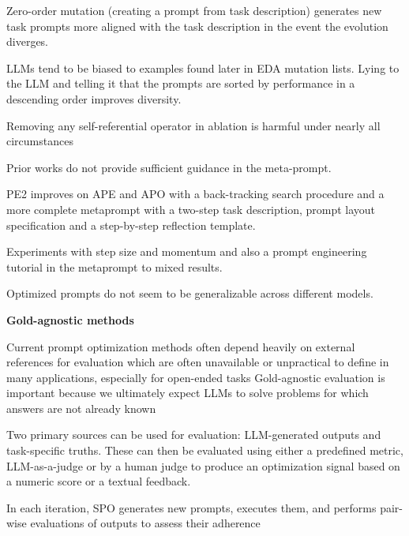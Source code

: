 Zero-order mutation (creating a prompt from task description) generates new task prompts more aligned with the task description in the event the evolution diverges.  \cite{fernando2023promptbreederselfreferentialselfimprovementprompt}

LLMs tend to be biased to examples found later in EDA mutation lists. Lying to the LLM and telling it that the prompts are sorted by performance in a descending order improves diversity.  \cite{fernando2023promptbreederselfreferentialselfimprovementprompt}

Removing any self-referential operator in ablation is harmful under nearly all circumstances \cite{fernando2023promptbreederselfreferentialselfimprovementprompt}


Prior works do not provide sufficient guidance in the meta-prompt. \cite{ye2024promptengineeringpromptengineer}

PE2 improves on APE and APO with a back-tracking search procedure and a more complete metaprompt with a two-step task description, prompt layout specification and a step-by-step reflection template. \cite{ye2024promptengineeringpromptengineer}

Experiments with step size and momentum and also a prompt engineering tutorial in the metaprompt to mixed results. \cite{ye2024promptengineeringpromptengineer}

Optimized prompts do not seem to be generalizable across different models.  \cite{ye2024promptengineeringpromptengineer}


\textbf{Gold-agnostic methods}

Current prompt optimization methods often depend heavily on external references for evaluation which are often unavailable or unpractical to define in many applications, especially for open-ended tasks \cite{xiang2025selfsupervisedpromptoptimization}
Gold-agnostic evaluation is important because we ultimately expect LLMs to solve problems for which answers are not already known \cite{zhang2024glapegoldlabelagnosticprompt}

Two primary sources can be used for evaluation: LLM-generated outputs and task-specific truths. These can then be evaluated using either a predefined metric, LLM-as-a-judge or by a human judge to produce an optimization signal based on a numeric score or a textual feedback.  \cite{xiang2025selfsupervisedpromptoptimization}

In each iteration, SPO generates new prompts, executes them, and performs pair-wise evaluations of outputs to assess their adherence \cite{xiang2025selfsupervisedpromptoptimization}

